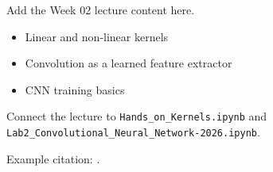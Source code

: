 Add the Week 02 lecture content here.

\begin{itemize}
  \item Linear and non-linear kernels
  \item Convolution as a learned feature extractor
  \item CNN training basics
\end{itemize}

Connect the lecture to \texttt{Hands\_on\_Kernels.ipynb} and \texttt{Lab2\_Convolutional\_Neural\_Network-2026.ipynb}.

Example citation: \textcite{krizhevsky2012}.
